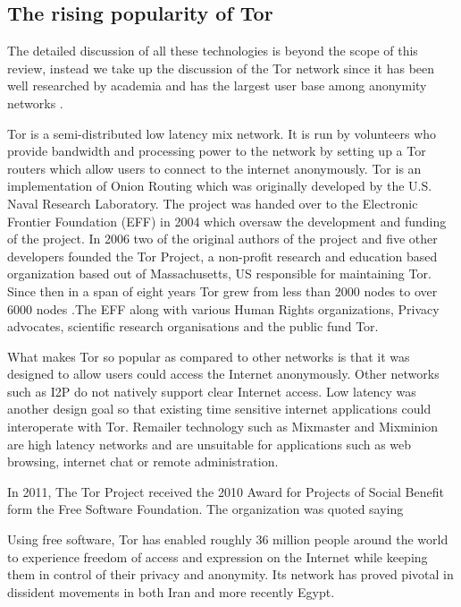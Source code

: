 \documentclass{llncs}
\begin{document}
\subsection{The rising popularity of Tor}
The detailed discussion of all these technologies is beyond the scope of this review, instead we take up the discussion of the Tor network since it has been well researched by academia and has the largest user base among anonymity networks \cite{tor-metrics}.

Tor is a semi-distributed low latency mix network. It is run by volunteers who provide bandwidth and processing power to the network by setting up a Tor routers which allow users to connect to the internet anonymously. Tor is an implementation of Onion Routing which was originally developed by the U.S. Naval Research Laboratory. The project was handed over to the Electronic Frontier Foundation (EFF) in 2004 which oversaw the development and funding of the project. In 2006 two of the original authors of the project and five other developers founded the Tor Project, a non-profit research and education based organization based out of Massachusetts, US responsible for maintaining Tor. Since then in a span of eight years Tor grew from less than 2000 nodes to over 6000 nodes \cite{tor-metrics}.The EFF along with various Human Rights organizations, Privacy advocates, scientific research organisations and the public fund Tor.
 
What makes Tor so popular as compared to other networks is that it was designed to allow users could access the Internet anonymously. Other networks such as I2P do not natively support clear Internet access. Low latency was another design goal so that existing time sensitive internet applications could interoperate with Tor. Remailer technology such as Mixmaster and Mixminion are high latency networks and are unsuitable for applications such as web browsing, internet chat or remote administration.

In 2011, The Tor Project received the 2010 Award for Projects of Social Benefit form the Free Software Foundation. The organization was quoted saying
\begin{displayquote}
Using free software, Tor has enabled roughly 36 million people around the world to experience freedom of access and expression on the Internet while keeping them in control of their privacy and anonymity. Its network has proved pivotal in dissident movements in both Iran and more recently Egypt.\cite{free-software-foundation}
\end{displayquote}
\end{document}
